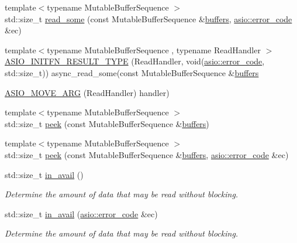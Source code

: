 \begin{DoxyCompactItemize}
\item 
{\footnotesize template$<$typename Mutable\+Buffer\+Sequence $>$ }\\std\+::size\+\_\+t \hyperlink{classasio_1_1buffered__stream_aea1fbe0c4cbe3c0cd2430912aa826e6b}{read\+\_\+some} (const Mutable\+Buffer\+Sequence \&\hyperlink{group__async__read_ga54dede45c3175148a77fe6635222c47d}{buffers}, \hyperlink{classasio_1_1error__code}{asio\+::error\+\_\+code} \&ec)
\item 
{\footnotesize template$<$typename Mutable\+Buffer\+Sequence , typename Read\+Handler $>$ }\\\hyperlink{classasio_1_1buffered__stream_af02e973b4f249f038403a070cc328a3e}{A\+S\+I\+O\+\_\+\+I\+N\+I\+T\+F\+N\+\_\+\+R\+E\+S\+U\+L\+T\+\_\+\+T\+Y\+P\+E} (Read\+Handler, void(\hyperlink{classasio_1_1error__code}{asio\+::error\+\_\+code}, std\+::size\+\_\+t)) async\+\_\+read\+\_\+some(const Mutable\+Buffer\+Sequence \&\hyperlink{group__async__read_ga54dede45c3175148a77fe6635222c47d}{buffers}
\item 
\hyperlink{classasio_1_1buffered__stream_a494f281948c9debf6920697ff0ca0529}{A\+S\+I\+O\+\_\+\+M\+O\+V\+E\+\_\+\+A\+R\+G} (Read\+Handler) handler)
\item 
{\footnotesize template$<$typename Mutable\+Buffer\+Sequence $>$ }\\std\+::size\+\_\+t \hyperlink{classasio_1_1buffered__stream_ade4c2160be727497e32963322ef96252}{peek} (const Mutable\+Buffer\+Sequence \&\hyperlink{group__async__read_ga54dede45c3175148a77fe6635222c47d}{buffers})
\item 
{\footnotesize template$<$typename Mutable\+Buffer\+Sequence $>$ }\\std\+::size\+\_\+t \hyperlink{classasio_1_1buffered__stream_a1d0067787b90bd34842710be194e32a1}{peek} (const Mutable\+Buffer\+Sequence \&\hyperlink{group__async__read_ga54dede45c3175148a77fe6635222c47d}{buffers}, \hyperlink{classasio_1_1error__code}{asio\+::error\+\_\+code} \&ec)
\item 
std\+::size\+\_\+t \hyperlink{classasio_1_1buffered__stream_a7e720406a8679da92e77e6f563705fad}{in\+\_\+avail} ()
\begin{DoxyCompactList}\small\item\em Determine the amount of data that may be read without blocking. \end{DoxyCompactList}\item 
std\+::size\+\_\+t \hyperlink{classasio_1_1buffered__stream_abebca47727263e90d857cb83427f96e3}{in\+\_\+avail} (\hyperlink{classasio_1_1error__code}{asio\+::error\+\_\+code} \&ec)
\begin{DoxyCompactList}\small\item\em Determine the amount of data that may be read without blocking. \end{DoxyCompactList}\end{DoxyCompactItemize}


